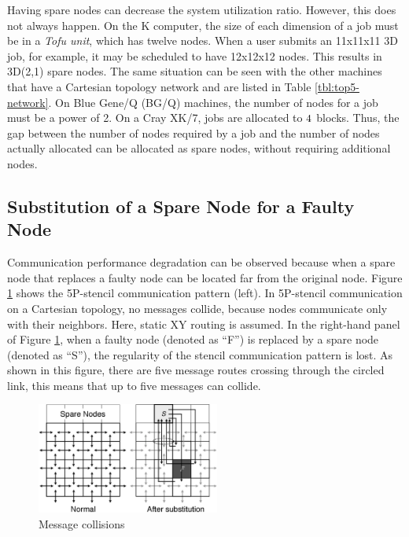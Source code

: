 \documentclass[Afour,times,sagev]{sagej}
\begin{document}
Having spare nodes can decrease the system utilization ratio. However,
this does not always happen. On the K computer, the size of each
dimension of a job must be in a {\it Tofu unit}, which has twelve
nodes. When a user submits an 11x11x11 3D job, for example, it may be
scheduled to have 12x12x12 nodes. This results in 3D(2,1) spare
nodes. The same situation can be seen with the other machines that
have a Cartesian topology network and are listed in Table
\ref{tbl:top5-network}. On Blue Gene/Q (BG/Q) machines, the number of
nodes for a job must be a power of 2\citep{BGQ-admin}. On a Cray XK/7,
jobs are allocated to $4 \time 2 \time 8$
blocks\citep{Pena:2013:ATM:2488551.2488564}. Thus, the gap between the
number of nodes required by a job and the number of nodes actually
allocated can be allocated as spare nodes, without requiring
additional nodes.

\subsection{Substitution of a Spare Node for a Faulty Node}
\label{sec:substitution}

Communication performance degradation can be observed because when a
spare node that replaces a faulty node can be located far from the
original node. Figure \ref{fig:collisions} shows the 5P-stencil
communication pattern (left). In 5P-stencil communication on a
Cartesian topology, no messages collide, because nodes communicate
only with their neighbors. Here, static XY routing is assumed. In the
right-hand panel of Figure \ref{fig:collisions}, when a faulty node
(denoted as ``F'') is replaced by a spare node (denoted as ``S''), the
regularity of the stencil communication pattern is lost. As shown in
this figure, there are five message routes crossing through the
circled link, this means that up to five messages can collide.

\begin{figure}[ht]
\centering
\includegraphics[width=60mm]{Figs/Collision.eps}
  \caption{Message collisions}
  \label{fig:collisions}
\end{figure}
\end{document}

